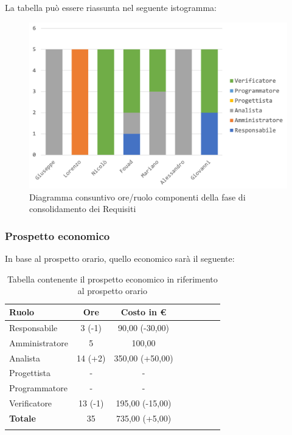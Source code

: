 			La tabella può essere riassunta nel seguente istogramma:
			
			\begin{figure}[H]
				\centering
				\includegraphics[width=0.8\linewidth]{images/consuntivo/ConsReqCons.png}
				\caption{Diagramma consuntivo ore/ruolo componenti della fase di consolidamento dei Requisiti}
				\label{fig:consuntivo diagramma suddivisione ruoli fase di consolidamento dei requisiti}
			\end{figure}
			
		\subsubsection{Prospetto economico}
			In base al prospetto orario, quello economico sarà il seguente: 
			
			\begin{longtable}{|l|c|c|c|c|c|c|c|}
				\hline
				\rowcolor{lighter-grayer}
				\textbf{Ruolo} & \textbf{Ore} & \textbf{Costo in €} \\
				\hline
				\endfirsthead
				
				\hline
				Responsabile & 3 (-1) & 90,00 (-30,00)\\
				\hline
				\hline
				Amministratore & 5 & 100,00\\
				\hline
				\hline
				Analista & 14 (+2) & 350,00 (+50,00)\\
				\hline
				\hline
				Progettista & - & -\\
				\hline
				\hline
				Programmatore & -  & -\\
				\hline
				\hline
				Verificatore & 13 (-1) & 195,00 (-15,00)\\
				\hline
				\textbf{Totale} & 35 & 735,00 (+5,00)\\
				\hline
				\caption{Tabella contenente il prospetto economico in riferimento al prospetto orario}
			\end{longtable}
			\pagebreak
			
